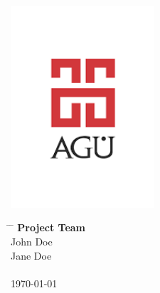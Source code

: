 \begin{center}
	\includegraphics[width=0.4\textwidth]{assets/agu.png}

	\Huge
	\textbf{\paperTitle}

	\vspace{0.3cm}
	\Huge
	\paperSubTitle{}

	\vspace{0.8cm}
	\large
	\vspace{0.5cm}
	\LARGE
	\vspace{1.5cm}
	\textbf{}
	\vfill
	\vspace{0.8cm}
	\Large
\end{center}

\begin{tabbing}
	\hspace*{1em}\= \hspace*{10em} \= \kill
	\> \textbf{Project Team} \> \\

	\> John Doe  \\
	\> Jane Doe  \\
	\> \> \\
	\> \today \> \\
\end{tabbing}

